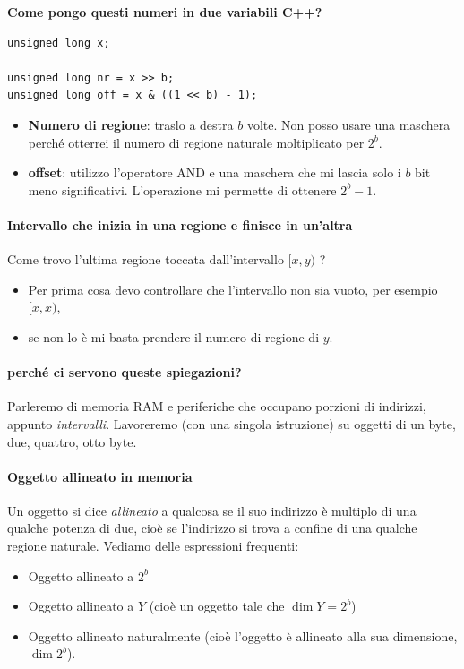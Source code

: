 \documentclass[11pt]{report}
\theoremstyle{definition}
\begin{document}
\begin{framed}
\noindent \textbf{Come pongo questi numeri in due variabili C++?}
\begin{verbatim}
unsigned long x;

unsigned long nr = x >> b;
unsigned long off = x & ((1 << b) - 1);
\end{verbatim}
\begin{itemize}
\item \textbf{Numero di regione}: traslo a destra $b$ volte. Non posso usare una maschera perché otterrei il numero di regione naturale moltiplicato per $2^b$.
\item \textbf{offset}: utilizzo l'operatore AND e una maschera che mi lascia solo i $b$ bit meno significativi. L'operazione mi permette di ottenere $2^b-1$.
\end{itemize}
\end{framed}
\paragraph{Intervallo che inizia in una regione e finisce in un'altra} Come trovo l'ultima regione toccata dall'intervallo $[x,y)$ ? 
\begin{itemize}
	\item Per prima cosa devo controllare che l'intervallo non sia vuoto, per esempio $[x,x)$, 
	\item se non lo è mi basta prendere il numero di regione di $y$.
\end{itemize}
\paragraph{perché ci servono queste spiegazioni?} Parleremo di memoria RAM e periferiche che occupano porzioni di indirizzi, appunto \emph{intervalli}. Lavoreremo (con una singola istruzione) su oggetti di un byte, due, quattro, otto byte.

\paragraph{Oggetto allineato in memoria} Un oggetto si dice \emph{allineato} a qualcosa se il suo indirizzo è multiplo di una qualche potenza di due, cioè se l'indirizzo si trova a confine di una qualche regione naturale. Vediamo delle espressioni frequenti:
\begin{itemize}
\item Oggetto allineato a $2^b$
\item Oggetto allineato a $Y$ (cioè un oggetto tale che $\dim Y = 2^b$)
\item Oggetto allineato naturalmente (cioè l'oggetto è allineato alla sua dimensione, $\dim 2^b$).
\end{itemize}
\end{document}
